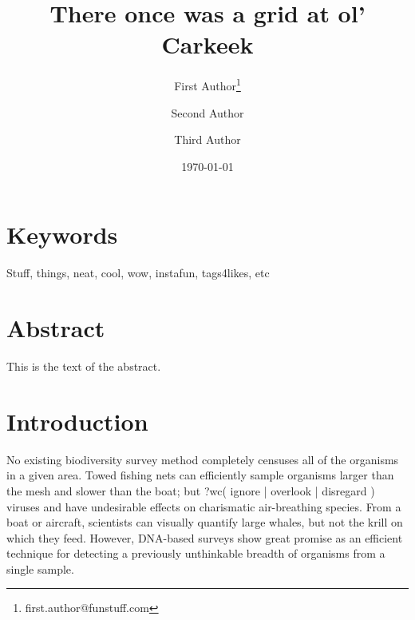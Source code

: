 \documentclass[11pt,letterpaper]{article} %
\date{\today}
\title{There once was a grid at ol' Carkeek}
\author[1]{First Author\thanks{first.author@funstuff.com}}
\author[1,2]{Second Author}
\author[2]{Third Author}
\affil[1]{Department of Computer Science, \LaTeX\ University}
\affil[2]{Department of Mechanical Engineering, Superfabulous University}
\begin{document}
\maketitle
\linenumbers %
\def\linenumberfont{\normalfont\small\rmfamily} %


\section*{Keywords}
Stuff, things, neat, cool, wow, instafun, tags4likes, etc

\section*{Abstract}
This is the text of the abstract.

\section*{Introduction}

No existing biodiversity survey method completely censuses all of the organisms in a given area.
Towed fishing nets can efficiently sample organisms larger than the mesh and slower than the boat; but ?wc( ignore | overlook | disregard ) viruses and have undesirable effects on charismatic air-breathing species.
From a boat or aircraft, scientists can visually quantify large whales, but not the krill on which they feed.
However, DNA-based surveys show great promise as an efficient technique for detecting a previously unthinkable breadth of organisms from a single sample.
\end{document}

